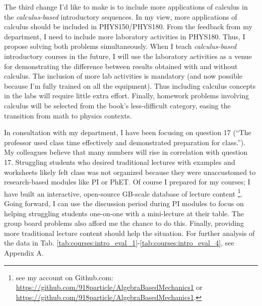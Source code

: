 \documentclass[../../main.tex]{subfiles}
\begin{document}
The third change I'd like to make is to include more applications of calculus in the \textit{calculus-based} introductory sequences.  In my view, more applications of calculus should be included in PHYS150/PHYS180.  From the feedback from my department, I need to include more laboratory activities in PHYS180.  Thus, I propose solving both problems simultaneously.  When I teach \textit{calculus-based} introductory courses in the future, I will use the laboratory activities as a venue for demonstrating the difference between results obtained with and without calculus.  The inclusion of more lab activities is mandatory (and now possible because I'm fully trained on all the equipment).  Thus including calculus concepts in the labs will require little extra effort.  Finally, homework problems involving calculus will be selected from the book's less-difficult category, easing the transition from math to physics contexts. \\ \hspace{0.1cm}

In consultation with my department, I have been focusing on question 17 (``The professor used class time effectively and demonstrated preparation for class.'').  My colleagues believe that many numbers will rise in correlation with question 17.  Struggling students who desired traditional lectures with examples and worksheets likely felt class was not organized because they were unaccustomed to research-based modules like PI or PhET.  Of course I prepared for my courses; I have built an interactive, open-source GB-scale database of lecture content \footnote{see my account on Github.com: \url{https://github.com/918particle/AlgebraBasedMechanics1} or \url{https://github.com/918particle/AlgebraBasedMechanics1}.}.  Going forward, I can use the discussion period during PI modules to focus on helping struggling students one-on-one with a mini-lecture at their table.  The group board problems also afford me the chance to do this.  Finally, providing more traditional lecture content should help the situation. For further analysis of the data in Tab. \ref{tab:courses:intro_eval_1}-\ref{tab:courses:intro_eval_4}, see Appendix A. \\ \hspace{0.1cm}
\end{document}
